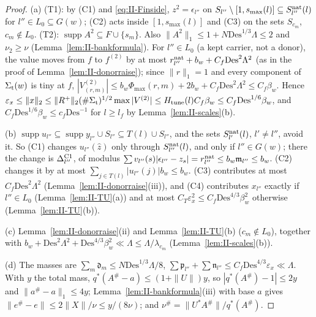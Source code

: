 \documentclass[10pt]{amsart}
\theoremstyle{definition}
\theoremstyle{remark}
\newcommand{\supp}{\operatorname{supp}}
\newcommand{\zh}{\hat z}
\begin{document}
\begin{proof}
(a) (T1): by (C1) and \eqref{eq:II-Finside}, $z^2=\epsilon_{l''}$ on
$S_{l''}\setminus[1,s_{\max}(l)]\subseteq S^{\rm nat}_{l''}(l)$ for $l''\in
L_0\subseteq G(w)$; (C2) acts inside $[1,s_{\max}(l)]$ and (C3) on the sets
$S_{c_m}$, $c_m\notin L_0$.  (T2): $\supp A^2\subseteq F\cup\{s_m\}$.  Also
$\|A^2\|_1\le1+N\mathrm{Des}^{1/3}\Lambda\le2$ and $\nu_2\ge\nu$
(Lemma~\ref{lem:II-bankformula}).  For $l''\in L_0$ (a kept carrier, not a
donor), the value moves from $f$ to $f^{(2)}$ by at most $r^{\rm nat}_{l''}+
b_w+C_f\mathrm{Des}^2\Lambda^2$ (as in the proof of
Lemma~\ref{lem:II-donorraise}); since $\|r\|_1=1$ and every component of
$\Sigma_{\rm t}(w)$ is tiny at $f$,
$|V^{(2)}_{(r,m)}|\le b_w\Phi_{\max}(r,m)+2b_w+C_f\mathrm{Des}^2\Lambda^2\le
C_f\beta_w$.  Hence $\varepsilon_x\le\|x\|_2\le\|R^+\|_2(\#\Sigma_{\rm t})^{1/2}
\max|V^{(2)}|\le H_{\rm tune}(l)C_f\beta_w\le C_f\mathrm{Des}^{1/6}\beta_w$,
and $C_f\mathrm{Des}^{1/6}\beta_w\le c_f\mathrm{Des}^{-1}$ for $l\ge l_f$ by
Lemma~\ref{lem:II-scales}(b).

(b) $\supp u_{l''}\subseteq\supp y_{l''}\cup S_{l''}\subseteq T(l)\cup
S_{l''}$, and the sets $S^{\rm nat}_{l'}(l)$, $l'\ne l''$, avoid it.  So
(C1) changes $u_{l''}(\zh)$ only through $S^{\rm nat}_{l''}(l)$, and only if
$l''\in G(w)$; there the change is $\Delta^{\rm C1}_{l''}$, of modulus
$\sum v_{l''}(s)|\epsilon_{l''}-z_s|=r^{\rm nat}_{l''}\le b_w\mathfrak m_{l''}
\le b_w$.  (C2) changes it by at most $\sum_{j\in T(l)}|u_{l''}(j)|b_w\le
b_w$.  (C3) contributes at most $C_f\mathrm{Des}^2\Lambda^2$
(Lemma~\ref{lem:II-donorraise}(iii)), and (C4) contributes $x_{l''}$ exactly
if $l''\in L_0$ (Lemma~\ref{lem:II-TU}(a)) and at most $C_T\varepsilon_x^2\le
C_f\mathrm{Des}^{4/3}\beta_w^2$ otherwise (Lemma~\ref{lem:II-TU}(b)).

(c) Lemma~\ref{lem:II-donorraise}(ii) and Lemma~\ref{lem:II-TU}(b) ($c_m\notin
L_0$), together with $b_w+\mathrm{Des}^2\Lambda^2+\mathrm{Des}^{4/3}
\beta_w^2\ll\Lambda\le\Lambda/\lambda_{c_m}$ (Lemma~\ref{lem:II-scales}(b)).

(d) The masses are $\sum_m\mathfrak d_m\le N\mathrm{Des}^{1/3}\Lambda/8$,
$\sum\mathfrak p_{l''}+\sum\mathfrak n_{l''}\le C_f\mathrm{Des}^{4/3}
\varepsilon_x\ll\Lambda$.  With $y$ the total mass, $q^*(A^\#-a)\le
(1+\|U\|)y$, so $|q^*(A^\#)-1|\le2y$ and $\|a^\#-a\|_1\le4y$;
Lemma~\ref{lem:II-bankformula}(iii) with base $a$ gives $\|e^\#-e\|\le2
\|X\|/\nu\le y/(8\nu)$; and $\nu^\#=\|U^*A^\#\|/q^*(A^\#)$.


\end{proof}
\end{document}
